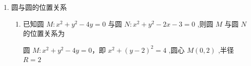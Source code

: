 \begin{enumerate}
\begin{enumerate}
\begin{jieda}
            因为 $\dfrac{5}{3} < 4{\sin }^{2}\theta  + 1 \leq  5$，所以 $1 \leq  \dfrac{5}{4{\sin }^{2}\theta  + 1} < 3$，所以 $2\sqrt{{r}^{2} - {d}^{2}} = 2\sqrt{3 - \dfrac{5}{4{\sin }^{2}\theta  + 1}} \in  (0,2\sqrt{2}\rbrack$ .
            
            所以当 $4{\sin }^{2}\theta  + 1 = 5$ ,即 ${\sin }^{2}\theta  = 1$ 时,弦长有最大值 $2\sqrt{2}$ .
        \end{jieda}
        \item 若直线 $\left( {m + 1}\right) x + {my} - {2m} - 1 = 0$ 与圆 ${x}^{2} + {y}^{2} = 3$ 交于 $M,N$ 两点,则弦长 $\left| {MN}\right|$ 的最小值为
        \begin{jieda}
            直线 ${MN}$ 的方程可化为 $m\left( {x + y - 2}\right)  + x - 1 = 0$ ,由 $\left\{  {\begin{array}{l} x + y - 2 = 0, \\  x - 1 = 0, \end{array}\;}\right.$ 得 $\left\{  \begin{array}{l} x = 1, \\  y = 1, \end{array}\right.$
            
            所以直线 ${MN}$ 过定点 $A\left( {1,1}\right)$ ,
            
            因为 ${1}^{2} + {1}^{2} < 3$ ,即点 $A$ 在圆 ${x}^{2} + {y}^{2} = 3$ 内,
            
            圆 ${x}^{2} + {y}^{2} = 3$ 的圆心为原点 $O$ ,半径为 $\sqrt{3}$ ,
            
            当 ${OA} \bot  {MN}$ 时,圆心 $O$ 到直线 ${MN}$ 的距离取得最大值,
            
            此时 $\left| {MN}\right|$ 取最小值,故 ${\left| MN\right| }_{\min } = 2\sqrt{3 - {\left| OA\right| }^{2}} = 2$ .
        \end{jieda}
    \end{enumerate}
    \item 圆与圆的位置关系
    \begin{enumerate}
        \item 已知圆 $M : {x}^{2} + {y}^{2} - {4y} = 0$ 与圆 $N : {x}^{2} + {y}^{2} - {2x} - 3 = 0$ ,则圆 $M$ 与圆 $N$ 的位置关系为
        \begin{jieda}
            圆 $M : {x}^{2} + {y}^{2} - {4y} = 0$，即 ${x}^{2} + {\left( y - 2\right) }^{2} = 4$ ,圆心 $M\left( {0,2}\right)$ ,半径 $R = 2$
            

\end{jieda}
\end{enumerate}
\end{enumerate}
